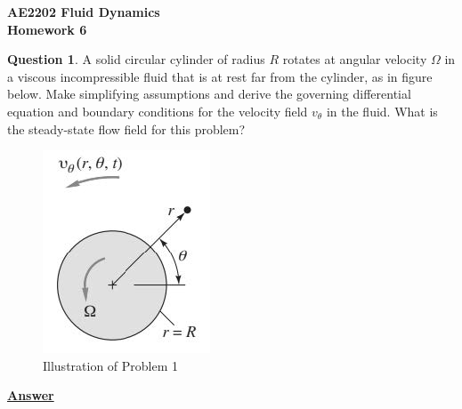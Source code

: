 \documentclass[10pt]{article}
\begin{document}

\begin{center}
    \textbf{AE2202 Fluid Dynamics} \\
    \textbf{Homework 6}
\end{center}

\hfill

\textbf{Question 1}. A solid circular cylinder of radius $R$ rotates at angular velocity $\Omega$ in a viscous incompressible fluid that is at rest far from the cylinder, as in figure below. Make simplifying assumptions and derive the governing differential equation and boundary conditions for the velocity field $v_\theta$ in the fluid. What is the steady-state flow field for this problem?

\begin{figure}[h]
    \centering
    \includegraphics{Problem1.jpg}
    \caption{Illustration of Problem 1}
    \label{fig:figprob1}
\end{figure}

\textbf{\underline{Answer}}
\end{document}

